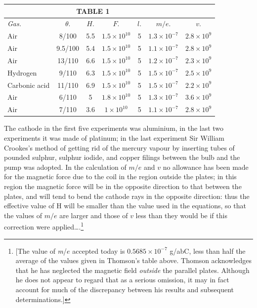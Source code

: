 \begin{center}
\begin{tabular}{l*{6}{c}}
\multicolumn{6}{c}{TABLE 1}\\
\hline
\emph{Gas.} & $\theta.$ & $H.$ & $F.$ & $l.$ & $m/e.$ & $v.$\\
Air           & 8/100   & 5.5 & $1.5\!\times\!{10^{10}}$ & 5 & $1.3\!\times\!{10^{-7}}$ & $2.8\!\times\!{10^9}$\\
Air           & 9.5/100 & 5.4 & $1.5\!\times\!{10^{10}}$ & 5 & $1.1\!\times\!{10^{-7}}$ & $2.8\!\times\!{10^9}$\\
Air           & 13/110  & 6.6 & $1.5\!\times\!{10^{10}}$ & 5 & $1.2\!\times\!{10^{-7}}$ & $2.3\!\times\!{10^9}$\\
Hydrogen      & 9/110   & 6.3 & $1.5\!\times\!{10^{10}}$ & 5 & $1.5\!\times\!{10^{-7}}$ & $2.5\!\times\!{10^9}$\\
Carbonic acid & 11/110  & 6.9 & $1.5\!\times\!{10^{10}}$ & 5 & $1.5\!\times\!{10^{-7}}$ & $2.2\!\times\!{10^9}$\\
Air           & 6/110   & 5   & $1.8\!\times\!{10^{10}}$ & 5 & $1.3\!\times\!{10^{-7}}$ & $3.6\!\times\!{10^9}$\\
Air           & 7/110   & 3.6 & $1\!\times\!{10^{10}}$   & 5 & $1.1\!\times\!{10^{-7}}$ & $2.8\!\times\!{10^9}$\\
\hline
\end{tabular}
\end{center}

The cathode in the first five experiments was aluminium, in the last two
experiments it was made of platinum; in the last experiment Sir William
Crookes's method of getting rid of the mercury vapour by inserting tubes
of pounded sulphur, sulphur iodide, and copper filings between the bulb
and the pump was adopted. In the calculation of $m/e$ and $v$
no allowance has been made for the magnetic force due to the coil in the
region outside the plates; in this region the magnetic force will be in
the opposite direction to that between the plates, and will tend to bend
the cathode rays in the opposite direction: thus the effective value of
H will be smaller than the value used in the equations, so that the
values of $m/e$ are larger and those of $v$ less than they
would be if this correction were applied\ldots.\footnote{{[}The value of
  \emph{m}/$e$ accepted today is $0.5685\!\times\!10^{-7}$ g/abC, less than
  half the average of the values given in Thomson's table above. Thomson
  acknowledges that he has neglected the magnetic field \emph{outside}
  the parallel plates. Although he does not appear to regard that as a
  serious omission, it may in fact account for much of the discrepancy
  between his results and subsequent determinations.{]}}

